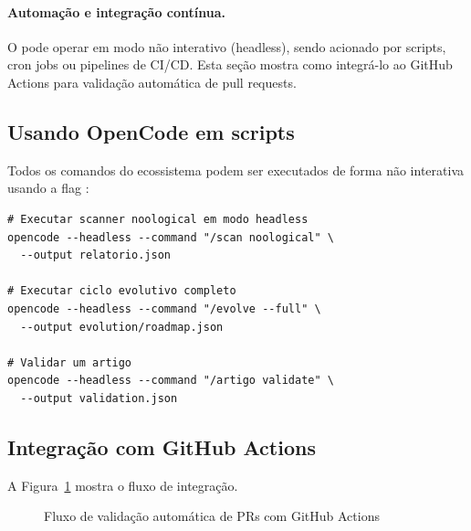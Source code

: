 \paragraph{Automação e integração contínua.} O \opencodeeco{} pode operar
em modo não interativo (headless), sendo acionado por scripts, cron jobs
ou pipelines de CI/CD. Esta seção mostra como integrá-lo ao GitHub Actions
para validação automática de pull requests.

\subsection{Usando OpenCode em scripts}
\label{subsec:headless-scripts}

Todos os comandos do ecossistema podem ser executados de forma não
interativa usando a flag :

\begin{lstlisting}[style=bashstyle, caption={Executando comandos em modo
headless}, label={lst:headless-cmd}]
# Executar scanner noological em modo headless
opencode --headless --command "/scan noological" \
  --output relatorio.json

# Executar ciclo evolutivo completo
opencode --headless --command "/evolve --full" \
  --output evolution/roadmap.json

# Validar um artigo
opencode --headless --command "/artigo validate" \
  --output validation.json
\end{lstlisting}

\subsection{Integração com GitHub Actions}
\label{subsec:github-actions}

A Figura~\ref{fig:headless-flow} mostra o fluxo de integração.

\begin{figure}[htb]
\centering
{}
\caption{Fluxo de validação automática de PRs com GitHub Actions}
\label{fig:headless-flow}
\end{figure}

